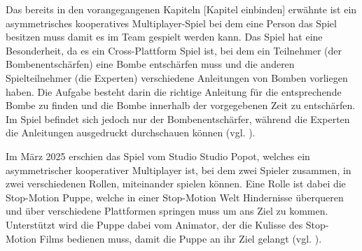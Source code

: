Das bereits in den vorangegangenen Kapiteln [Kapitel einbinden] erwähnte  ist ein asymmetrisches kooperatives Multiplayer-Spiel bei dem eine Person das Spiel besitzen muss damit es im Team gespielt werden kann. Das Spiel hat eine Besonderheit, da es ein Cross-Plattform Spiel ist, bei dem ein Teilnehmer (der Bombenentschärfen) eine Bombe entschärfen muss und die anderen Spielteilnehmer (die Experten) verschiedene Anleitungen von Bomben vorliegen haben. Die Aufgabe besteht darin die richtige Anleitung für die entsprechende Bombe zu finden und die Bombe innerhalb der vorgegebenen Zeit zu entschärfen. Im Spiel befindet sich jedoch nur der Bombenentschärfer, während die Experten die Anleitungen ausgedruckt durchschauen können (vgl. \cite{noauthor_keep_nodate}).

Im März 2025 erschien das Spiel  vom Studio Studio Popot, welches ein asymmetrischer kooperativer Multiplayer ist, bei dem zwei Spieler zusammen, in zwei verschiedenen Rollen, miteinander spielen können. Eine Rolle ist dabei die Stop-Motion Puppe, welche in einer Stop-Motion Welt Hindernisse überqueren und über verschiedene Plattformen springen muss um ans Ziel zu kommen. Unterstützt wird die Puppe dabei vom Animator, der die Kulisse des Stop-Motion Films bedienen muss, damit die Puppe an ihr Ziel gelangt (vgl. \cite{noauthor_myrmidon_2024}).






